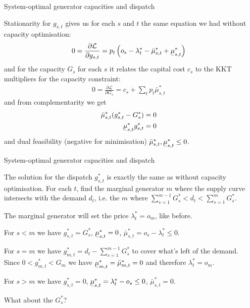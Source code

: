 \documentclass[10pt,aspectratio=169,dvipsnames]{beamer}
\def\l{\lambda}
\def\m{\mu}
\def\d{\partial}
\def\cL{\mathcal{L}}
\newcommand{\ubar}[1]{\text{\b{$#1$}}}
\begin{document}
\begin{frame}{System-optimal generator capacities and dispatch}

  Stationarity for $g_{s,t}$ gives us for each $s$ and $t$ the same equation we had without capacity optimisation:
  \begin{align*}
        0 = \frac{\d \cL}{\d g_{s,t}}  = p_t \left(o_s - \l_t^* - \bar{\m}^*_{s,t} + \ubar{\m}^*_{s,t} \right)
  \end{align*}
  and for the capacity $G_s$ for each $s$ it relates the capital cost $c_s$ to the KKT multipliers for the capacity constraint:
  \begin{align*}
        0 = \frac{\d \cL}{\d G_{s}}  = c_s + \sum_t p_t \bar{\m}^*_{s,t}
  \end{align*}
  and from complementarity we get
  \begin{align*}
    \bar{\m}^*_{s,t}(g_{s,t}^* - G_s^*) & = 0 \\
    \ubar{\m}^*_{s,t}g_{s,t}^* & = 0
  \end{align*}
  and dual feasibility (negative for minimisation) $ \bar{\m}^*_{s,t},  \ubar{\m}^*_{s,t} \leq 0$.
\end{frame}



\begin{frame}{System-optimal generator capacities and dispatch}

  The solution for the dispatch $g_{s,t}^*$ is exactly the same as
  without capacity optimisation. For each $t$, find the marginal generator $m$
  where the supply curve intersects with the demand $d_t$, i.e. the $m$
  where   $\sum_{s=1}^{m-1} G_s^* < d_t < \sum_{s=1}^{m} G_s^*$.

  The \alert{marginal generator will set the price} $\l^*_t = o_m$, like before.


  For $s < m$ we have $g_{s,t}^* = G_s^*$, $\ubar{\m}^*_{s,t} = 0$,
  $\bar{\m}^*_{s,t} = o_s - \l_t^* \leq 0$.

  For $s = m$ we have $g_{m,t}^* = d_t - \sum_{s=1}^{m-1} G_s^*$ to cover
  what's left of the demand. Since $0 < g_{m,t}^* < G_m$ we have
  $\ubar{\m}^*_{m,t} = \bar{\m}^*_{m,t} = 0$ and therefore $\l_t^* = o_m$.

  For $s > m$ we have $g_{s,t}^* = 0$,
  $\ubar{\m}^*_{s,t} = \l_t^*-o_s \leq 0 $, $\bar{\m}^*_{s,t} = 0$.

  What about the $G_s^*$?


\end{frame}
\end{document}
